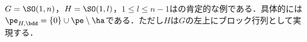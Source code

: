 \begin{cor}\label{cor:prob-eg}
  $G = \SO(1,n) $，$H = \SO(1,l) $，$1\leq l\leq n-1$はの肯定的な例である．具体的には$\pe_{H,\bdd} = \{0\}\cup \pe\setminus\ha $である．ただし$H$は$G$の左上にブロック行列として実現する．
\end{cor}


